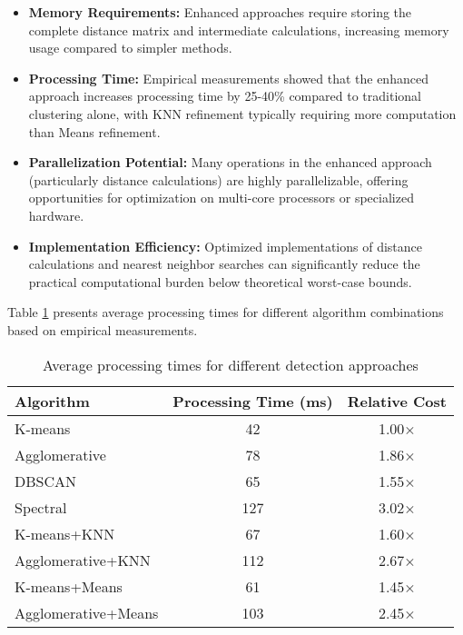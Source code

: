 \begin{itemize}
    \item \textbf{Memory Requirements:} Enhanced approaches require storing the complete distance matrix and intermediate calculations, increasing memory usage compared to simpler methods.
    
    \item \textbf{Processing Time:} Empirical measurements showed that the enhanced approach increases processing time by 25-40\% compared to traditional clustering alone, with KNN refinement typically requiring more computation than Means refinement.
    
    \item \textbf{Parallelization Potential:} Many operations in the enhanced approach (particularly distance calculations) are highly parallelizable, offering opportunities for optimization on multi-core processors or specialized hardware.
    
    \item \textbf{Implementation Efficiency:} Optimized implementations of distance calculations and nearest neighbor searches can significantly reduce the practical computational burden below theoretical worst-case bounds.
\end{itemize}

Table \ref{tab:complexity_practical} presents average processing times for different algorithm combinations based on empirical measurements.

\begin{table}[htbp]
    \centering
    \caption{Average processing times for different detection approaches}
    \label{tab:complexity_practical}
    \begin{tabular}{lcc}
        \toprule
        \textbf{Algorithm} & \textbf{Processing Time (ms)} & \textbf{Relative Cost} \\
        \midrule
        K-means & 42 & 1.00× \\
        Agglomerative & 78 & 1.86× \\
        DBSCAN & 65 & 1.55× \\
        Spectral & 127 & 3.02× \\
        \midrule
        K-means+KNN & 67 & 1.60× \\
        Agglomerative+KNN & 112 & 2.67× \\
        K-means+Means & 61 & 1.45× \\
        Agglomerative+Means & 103 & 2.45× \\
        \bottomrule
    \end{tabular}
\end{table}

